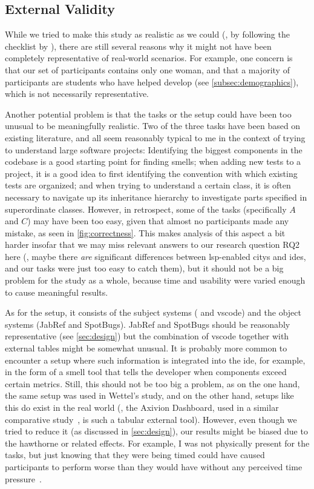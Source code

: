 \documentclass[../thesis]{subfiles}
\begin{document}
\subsection{External Validity}
While we tried to make this study as realistic as we could (\eg, by following the checklist by \textcite{wettel2011}), there are still several reasons why it might not have been completely representative of real-world scenarios.
For example, one concern is that our set of participants contains only one woman, and that a majority of participants are students who have helped develop \SEE{} (see \cref{subsec:demographics}), which is not necessarily representative.

Another potential problem is that the tasks or the setup could have been too unusual to be meaningfully realistic.
Two of the three tasks have been based on existing literature, and all seem reasonably typical to me in the context of trying to understand large software projects:
Identifying the biggest components in the codebase is a good starting point for finding \glspl{smell};
when adding new tests to a project, it is a good idea to first identifying the convention with which existing tests are organized;
and when trying to understand a certain class, it is often necessary to navigate up its inheritance hierarchy to investigate parts specified in superordinate classes.
However, in retrospect, some of the tasks (specifically $A$ and $C$) may have been too easy, given that almost no participants made any mistake, as seen in \cref{fig:correctness}.
This makes analysis of this aspect a bit harder insofar that we may miss relevant answers to our research question \textsf{RQ2} here (\eg, maybe there \emph{are} significant differences between \gls{lsp}-enabled \glspl{city} and \glspl{ide}, and our tasks were just too easy to catch them), but it should not be a big problem for the study as a whole, because time and usability were varied enough to cause meaningful results.

As for the setup, it consists of the subject systems (\SEE{} and \gls{vscode}) and the object systems (JabRef and SpotBugs).
JabRef and SpotBugs should be reasonably representative (see \cref{sec:design}) but the combination of \gls{vscode} together with external tables might be somewhat unusual.
It is probably more common to encounter a setup where such information is integrated into the \gls{ide}, for example, in the form of a \gls{smell} tool that tells the developer when components exceed certain metrics.
Still, this should not be too big a problem, as on the one hand, the same setup was used in Wettel's study, and on the other hand, setups like this do exist in the real world (\eg, the Axivion Dashboard, used in a similar comparative study~\cite[section~4.1]{galperin2021}, is such a tabular external tool).
However, even though we tried to reduce it (as discussed in \cref{sec:design}), our results might be biased due to the \gls{hawthorne} or related effects.
For example, I was not physically present for the tasks, but just knowing that they were being timed could have caused participants to perform worse than they would have without any perceived time pressure~\cite[\eg,][]{sussman2022a}.
\end{document}
